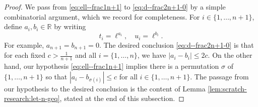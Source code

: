 \documentclass[reqno]{amsart}
\theoremstyle{plain} \newtheorem{theorem} {Theorem}
\theoremstyle{definition} \newtheorem{definition} [theorem] {Definition}
\theoremstyle{itplain} %
\numberwithin{equation}{section}
\numberwithin{theorem}{section}
\renewcommand{\leq}{\leqslant}
\begin{document}
\begin{proof}
  We pass from \eqref{eq:ell--frac1n+1} to \eqref{eq:d--frac2n+1-0} by a simple combinatorial argument, which we record for completeness.  For $i \in \{1,\dotsc,n+1\}$, define $a_i,b_i \in \mathbb{R}$ by writing
  \begin{equation*}
    t_i = \ell^{a_i}, \quad u_i = \ell^{b_i}.
  \end{equation*}
  For example, $a_{n+1} = b_{n+1} = 0$.  The desired conclusion \eqref{eq:d--frac2n+1-0} is that for each fixed $c > \frac{1}{n+1}$ and all $i = \{1, \dotsc, n\}$, we have $|a_i - b_i| \leq 2 c$.  On the other hand, our hypothesis \eqref{eq:ell--frac1n+1} implies there is a permutation $\sigma$ of $\{1,\dotsc,n+1\}$ so that $|a_i - b_{\sigma(i)}| \leq c$ for all $i \in \{1, \dotsc, n+1\}$.  The passage from our hypothesis to the desired conclusion is the content of
  Lemma \ref{lem:scratch-research:let-n-geq}, stated at the end of this subsection.
\end{proof}
\end{document}
